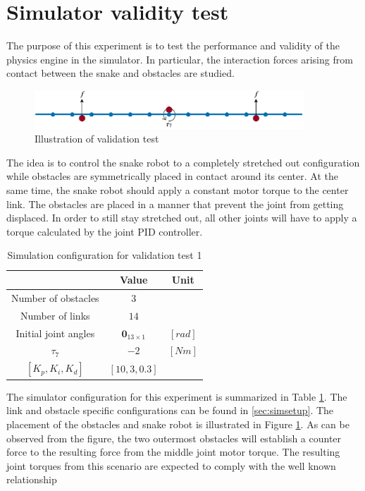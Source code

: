 \section{Simulator validity test}

The purpose of this experiment is to test the performance and validity of the physics engine in the simulator. In particular, the interaction forces arising from contact between the snake and obstacles are studied.

\begin{figure}
    \centering
    \includegraphics[width=0.9\textwidth]{figures/experiments/exp_valid1.pdf}
    \caption{Illustration of validation test}
    \label{fig:valid1_sketch}
\end{figure}

The idea is to control the snake robot to a completely stretched out configuration while obstacles are symmetrically placed in contact around its center. At the same time, the snake robot should apply a constant motor torque to the center link. The obstacles are placed in a manner that prevent the joint from getting displaced. In order to still stay stretched out, all other joints will have to apply a torque calculated by the joint PID controller.

\begin{table}[]
    \centering
    \begin{tabular}{|c|c|c|}
        \hline
        & Value & Unit\\
        \hline
        Number of obstacles & $3$ & \\
        Number of links & $14$ & \\
        Initial joint angles & $\mathbf{0}_{13 \times 1}$ & $[rad]$ \\
        $\tau_7$ & $-2$ & $[Nm]$ \\
        $[K_p, K_i, K_d]$ & $[10, 3, 0.3]$ &\\
        \hline
    \end{tabular}
    \caption{Simulation configuration for validation test 1}
    \label{tab:exp_valid1}
\end{table}

The simulator configuration for this experiment is summarized in Table \ref{tab:exp_valid1}. The link and obstacle specific configurations can be found in \ref{sec:simsetup}.
The placement of the obstacles and snake robot is illustrated in Figure \ref{fig:valid1_sketch}. As can be observed from the figure, the two outermost obstacles will establish a counter force to the resulting force from the middle joint motor torque. The resulting joint torques from this scenario are expected to comply with the well known relationship

